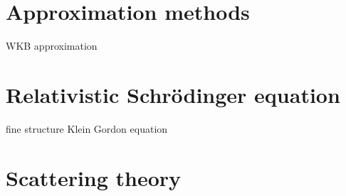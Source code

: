 \documentclass{../../large}
\begin{document}
\begin{prb}
\end{prb}
\begin{prb}
\end{prb}
\begin{prb}
\end{prb}
\begin{prb}
\end{prb}
\begin{prb}
\end{prb}

\section{Approximation methods}
WKB approximation

\section{Relativistic Schr\"odinger equation}
fine structure
Klein Gordon equation

\section{Scattering theory}
\end{document}
